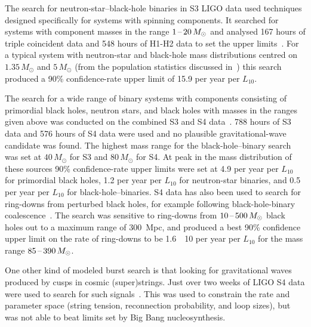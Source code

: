 The search for neutron-star--black-hole binaries in S3 LIGO data used techniques
designed specifically for systems with spinning components. It searched for
systems with component masses in the range $1\mbox{\,--\,}20\,M_{\odot}$ and analysed 167
hours of triple coincident data and 548 hours of H1-H2 data to set the upper
limits~\cite{Abbott:2008d}. For a typical system with neutron-star and black-hole mass distributions centred on $1.35\,M_{\odot}$ and $5\,M_{\odot}$ (from
the population statistics discussed in~\cite{Abbott:2008a}) this search produced
a 90\% confidence-rate upper limit of 15.9 per year per $L_{10}$.


The search for a wide range of binary systems with components consisting of
primordial black holes, neutron stars, and black holes with masses in the ranges
given above was conducted on the combined S3 and S4 data~\cite{Abbott:2008a}.
788 hours of S3 data and 576 hours of S4 data were used and no plausible
gravitational-wave candidate was found. The highest mass range for the black-hole--binary search was set at $40\,M_{\odot}$ for S3 and $80\,M_{\odot}$ for S4. At peak in the
mass distribution of these sources 90\% confidence-rate upper limits were set at
4.9 per year per $L_{10}$ for primordial black holes, 1.2 per year per $L_{10}$
for neutron-star binaries, and 0.5 per year per $L_{10}$ for black-hole--binaries.
S4 data has also been used to search for ring-downs from perturbed black holes,
for example following black-hole-binary coalescence~\cite{Abbott:2009g}. The
search was sensitive to ring-downs from $10\mbox{\,--\,}500\,M_{\odot}$ black holes out to
a maximum range of 300~Mpc, and produced a best 90\% confidence upper limit on
the rate of ring-downs to be 1.6~\texttimes~10 per year per
$L_{10}$ for the mass range $85\mbox{\,--\,}390\,M_{\odot}$.


One other kind of modeled burst search is that looking for gravitational waves
produced by cusps in cosmic (super)strings. Just over two weeks of LIGO S4 data
were used to search for such signals~\cite{Abbott:2009j}. This was used to
constrain the rate and parameter space (string tension, reconnection
probability, and loop sizes), but was not able to beat limits set by Big Bang
nucleosynthesis.


